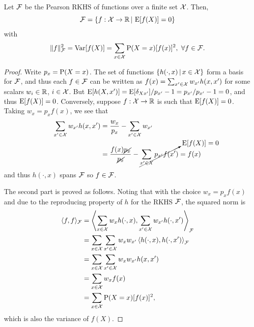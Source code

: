 \begin{proposition}
  Let ${\mathcal F}$ be the Pearson RKHS of functions over a finite set ${\mathcal X}$.
  Then,
  \[
    {\mathcal F} = \{f:{\mathcal X}\to\mathbb{R} \,|\, \operatorname{E} [f(X)] = 0 \}
  \]
  with
  \[
    \lVert f\rVert_{\mathcal F}^2 = \operatorname{Var} [f(X)] = \sum_{x\in{\mathcal X}} \operatorname{P}(X=x)[f(x)]^2, \ \forall f \in {\mathcal F}.
  \]
\end{proposition}

\begin{proof}
  Write $p_x = \operatorname{P}(X=x)$.
  The set of functions $\{h(\cdot,x) \,|\, x \in {\mathcal X}\}$ form a basis for ${\mathcal F}$, and thus each $f \in {\mathcal F}$ can be written as $f(x) = \sum_{x'\in{\mathcal X}} w_{x'}h(x,x')$ for some scalars $w_i\in\mathbb{R}$, $i\in{\mathcal X}$.
  But $\operatorname{E}[ h(X,x')] = \operatorname{E} [\delta_{Xx'}] / p_{x'} - 1 = p_{x'} / p_{x'} - 1 = 0$, and thus $\operatorname{E} [f(X)] = 0$.
  Conversely, suppose $f:{\mathcal X}\to\mathbb{R}$ is such that $\operatorname{E} [f(X)] = 0$.
  Taking $w_x = p_xf(x)$, we see that
  \begin{align*}
    \sum_{x'\in{\mathcal X}} w_{x'}h(x,x') 
    &= \frac{w_x}{p_x} - \sum_{x'\in{\mathcal X}} w_{x'} \\
    &= \frac{f(x)\cancel{p_x}}{\cancel{p_x}} - \cancelto{\operatorname{E} [f(X)] = 0}{\sum_{x'\in{\mathcal X}} p_{x'}f(x')} = f(x)
  \end{align*}
  and thus $h(\cdot,x)$ spans ${\mathcal F}$ so $f\in{\mathcal F}$.
  
  The second part is proved as follows.
  Noting that with the choice $w_x = p_xf(x)$ and due to the reproducing property of $h$ for the RKHS ${\mathcal F}$, the squared norm is 
  \begin{align*}
    \langle f,f\rangle_{\mathcal F} 
    &= \left\langle \sum_{x\in{\mathcal X}} w_{x}h(\cdot,x), \sum_{x'\in{\mathcal X}} w_{x'}h(\cdot,x') \right\rangle_{\mathcal F} \\
    &= \sum_{x\in{\mathcal X}} \sum_{x'\in{\mathcal X}} w_{x} w_{x'} \left\langle h(\cdot,x), h(\cdot,x') \right\rangle_{\mathcal F} \\
    &= \sum_{x\in{\mathcal X}} \sum_{x'\in{\mathcal X}} w_{x} w_{x'} h(x,x')  \\
    &= \sum_{x\in{\mathcal X}} w_{x} f(x) \\
    &= \sum_{x\in{\mathcal X}} \operatorname{P}(X=x) [f(x)]^2,
  \end{align*}
  which is also the variance of $f(X)$.
  \vspace{-0.5em}
\end{proof}


